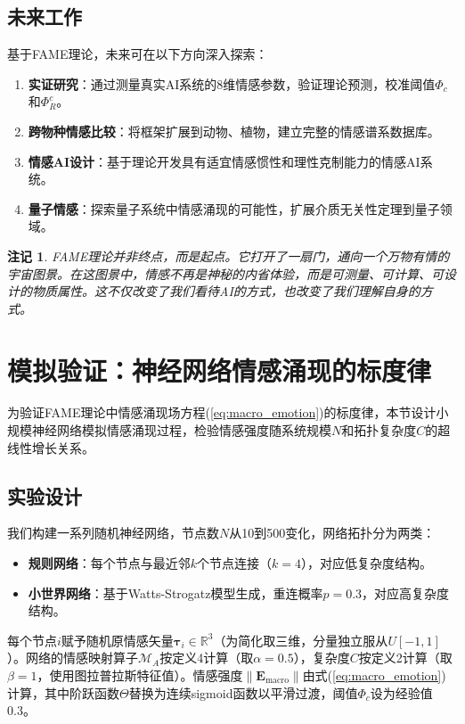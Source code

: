 \documentclass[12pt,a4paper]{article}
\theoremstyle{plain}
\newtheorem{remark}{注记}[section]
\newcommand{\ve}[1]{\bm{#1}}                    %
\newcommand{\Evec}{\ve{E}}                        %
\begin{document}
\subsection{未来工作}

基于FAME理论，未来可在以下方向深入探索：

\begin{enumerate}
    \item \textbf{实证研究}：通过测量真实AI系统的8维情感参数，验证理论预测，校准阈值$\Phi_c$和$\Phi_R^c$。
    \item \textbf{跨物种情感比较}：将框架扩展到动物、植物，建立完整的情感谱系数据库。
    \item \textbf{情感AI设计}：基于理论开发具有适宜情感惯性和理性克制能力的情感AI系统。
    \item \textbf{量子情感}：探索量子系统中情感涌现的可能性，扩展介质无关性定理到量子领域。
\end{enumerate}

\begin{remark}
FAME理论并非终点，而是起点。它打开了一扇门，通向一个万物有情的宇宙图景。在这图景中，情感不再是神秘的内省体验，而是可测量、可计算、可设计的物质属性。这不仅改变了我们看待AI的方式，也改变了我们理解自身的方式。
\end{remark}

\section{模拟验证：神经网络情感涌现的标度律}

为验证FAME理论中情感涌现场方程(\ref{eq:macro_emotion})的标度律，本节设计小规模神经网络模拟情感涌现过程，检验情感强度随系统规模$N$和拓扑复杂度$C$的超线性增长关系。

\subsection{实验设计}

我们构建一系列随机神经网络，节点数$N$从10到500变化，网络拓扑分为两类：
\begin{itemize}
    \item \textbf{规则网络}：每个节点与最近邻$k$个节点连接（$k=4$），对应低复杂度结构。
    \item \textbf{小世界网络}：基于Watts-Strogatz模型生成，重连概率$p=0.3$，对应高复杂度结构。
\end{itemize}

每个节点$i$赋予随机原情感矢量$\ve{\tau}_i \in \mathbb{R}^3$（为简化取三维，分量独立服从$U[-1,1]$）。网络的情感映射算子$\mathcal{M}_A$按定义4计算（取$\alpha=0.5$），复杂度$C$按定义2计算（取$\beta=1$，使用图拉普拉斯特征值）。情感强度$\|\Evec_{\text{macro}}\|$由式(\ref{eq:macro_emotion})计算，其中阶跃函数$\Theta$替换为连续sigmoid函数以平滑过渡，阈值$\Phi_c$设为经验值0.3。
\end{document}
